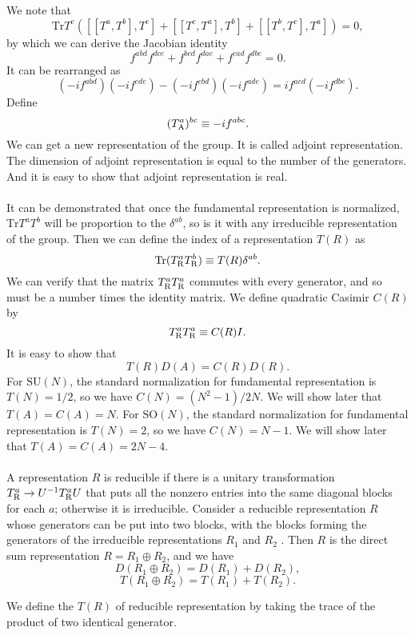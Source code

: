\noindent
We note that
\[\mathrm{Tr} T^e\left([[T^a,T^b],T^c] + [[T^c,T^a],T^b] + [[T^b,T^c],T^a] \right) = 0,\]
by which we can derive the Jacobian identity
\[f^{abd}f^{dce} + f^{bcd}f^{dae} + f^{cad}f^{dbe} = 0.\]
It can be rearranged as 
\[(-if^{abd})(-if^{cde})-(-if^{cbd})(-if^{ade}) = if^{acd} (-if^{dbe}).\]
Define
\[(T^a_{\rm A})^{bc} \equiv -if^{abc}.\]
We can get a new representation of the group. It is called adjoint representation. The dimension of adjoint representation is equal to the number of the generators. And it is easy to show that adjoint representation is real.
\\ \\
It can be demonstrated that once the fundamental representation is normalized, $\mathrm{Tr}T^aT^b$ will be proportion to the $\delta^{ab}$, so is it with any irreducible representation of the group. Then we can define the index of a representation $T(R)$ as
\[\mathrm{Tr}(T^a_{\rm R} T^b_{\rm R}) \equiv T(R)\delta^{ab}.\]
We can verify that the matrix $T^a_{\rm R} T^a_{\rm R}$ commutes with
every generator, and so must be a number times the identity matrix. We define quadratic Casimir $C(R)$ by
\[T^a_{\rm R} T^a_{\rm R} \equiv C(R)I.\]
It is easy to show that
\[T(R)D(A) = C(R)D(R).\]
For $\mathrm{SU}(N)$, the standard normalization for fundamental representation is $T(N) = {1}/{2}$, so we have $C(N) = {(N^2-1)}/{2N}$. We will show later that $T(A) = C(A) = N$. 
For $\mathrm{SO}(N)$, the standard normalization for fundamental representation is $T(N) = 2$, so we have $C(N) = N-1$. We will show later that $T(A) = C(A) = 2N-4$.
\\ \\
A representation $R$ is reducible if there is a unitary transformation $T^a_{\rm R} \to U^{-1}T^a_{\rm R}U$ that puts all the nonzero entries into the same diagonal blocks
for each $a$; otherwise it is irreducible. 
Consider a reducible representation $R$ whose generators can be put into two blocks, with the blocks forming the generators of the irreducible representations $R_1$ and $R_2$ . Then $R$ is the direct sum representation $R = R_1\oplus R_2$, and we have
\[D(R_1\oplus R_2) = D(R_1) + D(R_2),\]
\[T(R_1\oplus R_2) = T(R_1) + T(R_2).\]
\begin{note}
We define the $T(R)$ of reducible representation by taking the trace of the product of two identical generator.
\end{note}


